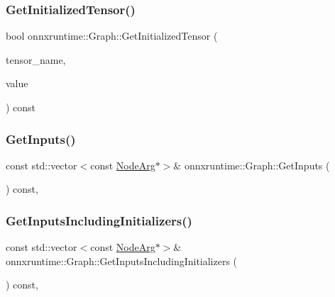 \mbox{\label{classonnxruntime_1_1Graph_ae0637d52edb20ae9a2700a29eb931e9c}} 
\subsubsection{\texorpdfstring{Get\+Initialized\+Tensor()}{GetInitializedTensor()}}
{\footnotesize\ttfamily bool onnxruntime\+::\+Graph\+::\+Get\+Initialized\+Tensor (\begin{DoxyParamCaption}\item[{const std\+::string \&}]{tensor\+\_\+name,  }\item[{const O\+N\+N\+X\+\_\+\+N\+A\+M\+E\+S\+P\+A\+C\+E\+::\+Tensor\+Proto $\ast$\&}]{value }\end{DoxyParamCaption}) const}

\mbox{\label{classonnxruntime_1_1Graph_a902f1039ac6666c1eb912694d73336d9}} 
\subsubsection{\texorpdfstring{Get\+Inputs()}{GetInputs()}}
{\footnotesize\ttfamily const std\+::vector$<$const \mbox{\hyperlink{classonnxruntime_1_1NodeArg}{Node\+Arg}}$\ast$$>$\& onnxruntime\+::\+Graph\+::\+Get\+Inputs (\begin{DoxyParamCaption}{ }\end{DoxyParamCaption}) const\hspace{0.3cm}{\ttfamily [inline]}, {\ttfamily [noexcept]}}

\mbox{\label{classonnxruntime_1_1Graph_a8862e9a9d1e7f6ee12fab84e1763e125}} 
\subsubsection{\texorpdfstring{Get\+Inputs\+Including\+Initializers()}{GetInputsIncludingInitializers()}}
{\footnotesize\ttfamily const std\+::vector$<$const \mbox{\hyperlink{classonnxruntime_1_1NodeArg}{Node\+Arg}}$\ast$$>$\& onnxruntime\+::\+Graph\+::\+Get\+Inputs\+Including\+Initializers (\begin{DoxyParamCaption}{ }\end{DoxyParamCaption}) const\hspace{0.3cm}{\ttfamily [inline]}, {\ttfamily [noexcept]}}

